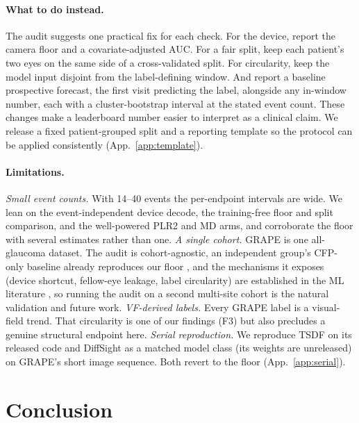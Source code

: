 \paragraph{What to do instead.} The audit suggests one practical fix for each check. For the device, report the camera
floor and a covariate-adjusted AUC. For a fair split, keep each patient's two eyes on the same side of a cross-validated
split. For circularity, keep the model input disjoint from the label-defining window. And report a baseline prospective
forecast, the first visit predicting the label, alongside any in-window number, each with a cluster-bootstrap interval
at the stated event count. These changes make a leaderboard number easier to interpret as a clinical claim. We release a
fixed patient-grouped split and a reporting template so the protocol can be applied consistently
(App.~\ref{app:template}).

\paragraph{Limitations.} \emph{Small event counts.} With 14--40 events the per-endpoint intervals are wide. We lean on
the event-independent device decode, the training-free floor and split comparison, and the well-powered PLR2 and MD
arms, and corroborate the floor with several estimates rather than one. \emph{A single cohort.} GRAPE is one
all-glaucoma dataset. The audit is cohort-agnostic, an independent group's CFP-only baseline already reproduces our
floor \citep{zheng2025gppm}, and the mechanisms it exposes (device shortcut, fellow-eye leakage, label circularity) are
established in the ML literature \citep{geirhos2020, kapoor2023leakage}, so running the audit on a second
multi-site cohort is the natural validation and future work. \emph{VF-derived labels.} Every GRAPE label is a
visual-field trend. That circularity is one of our findings (F3) but also precludes a genuine structural endpoint here.
\emph{Serial reproduction.} We reproduce TSDF on its released code and DiffSight as a matched model class (its weights
are unreleased) on GRAPE's short image sequence. Both revert to the floor (App.~\ref{app:serial}).

\section{Conclusion}
\label{sec:conclusion}

